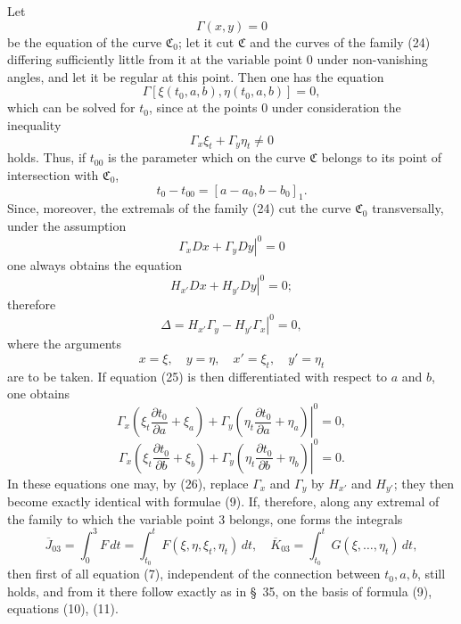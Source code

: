 \documentclass[11pt,a4paper,leqno]{article}
\begin{document}
Let
\[
\Gamma(x,y)=0
\]
be the equation of the curve $\mathfrak{C}_0$; let it cut $\mathfrak{C}$ and the curves of the family (24) differing sufficiently little from it at the variable point 0 under non-vanishing angles, and let it be regular at this point. Then one has the equation
\begin{equation}\tag{25}
\Gamma[\xi(t_0,a,b),\eta(t_0,a,b)]=0,
\end{equation}
which can be solved for $t_0$, since at the points 0 under consideration the inequality
\[
\Gamma_x\xi_t+\Gamma_y\eta_t\neq0
\]
holds. Thus, if $t_{00}$ is the parameter which on the curve $\mathfrak{C}$ belongs to its point of intersection with $\mathfrak{C}_0$,
\[
t_0-t_{00}=[a-a_0,b-b_0]_1.
\]
Since, moreover, the extremals of the family (24) cut the curve $\mathfrak{C}_0$ transversally, under the assumption
\[
\left.\Gamma_xDx+\Gamma_yDy\right|^0=0
\]
one always obtains the equation
\[
\left.H_{x'}Dx+H_{y'}Dy\right|^0=0;
\]
therefore
\begin{equation}\tag{26}
\left.\Delta=H_{x'}\Gamma_y-H_{y'}\Gamma_x\right|^0=0,
\end{equation}
where the arguments
\begin{equation}\tag{27}
x=\xi,\quad y=\eta,\quad x'=\xi_t,\quad y'=\eta_t
\end{equation}
are to be taken. If equation (25) is then differentiated with respect to $a$ and $b$, one obtains
\[
\left.\Gamma_x\left(\xi_t\frac{\partial t_0}{\partial a}+\xi_a\right)+\Gamma_y\left(\eta_t\frac{\partial t_0}{\partial a}+\eta_a\right)\right|^0=0,
\]
\[
\left.\Gamma_x\left(\xi_t\frac{\partial t_0}{\partial b}+\xi_b\right)+\Gamma_y\left(\eta_t\frac{\partial t_0}{\partial b}+\eta_b\right)\right|^0=0.
\]
In these equations one may, by (26), replace $\Gamma_x$ and $\Gamma_y$ by $H_{x'}$ and $H_{y'}$; they then become exactly identical with formulae (9). If, therefore, along any extremal of the family to which the variable point 3 belongs, one forms the integrals
\[
\overline{J}_{03}=\int_0^3 F\,dt=\int_{t_0}^{t}F(\xi,\eta,\xi_t,\eta_t)\,dt,\quad
\overline{K}_{03}=\int_{t_0}^{t}G(\xi,\ldots,\eta_t)\,dt,
\]
then first of all equation (7), independent of the connection between $t_0,a,b$, still holds, and from it there follow
exactly as in \S~35, on the basis of formula (9), equations (10), (11).
\end{document}

